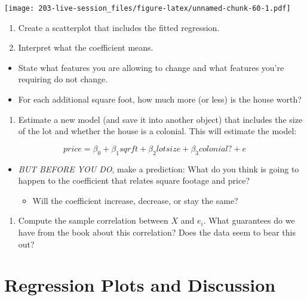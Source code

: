 \documentclass[
]{book}
\providecommand{\tightlist}{%
  \setlength{\itemsep}{0pt}\setlength{\parskip}{0pt}}
\theoremstyle{definition}
\theoremstyle{definition}
\theoremstyle{definition}
\theoremstyle{definition}
\theoremstyle{remark}
\begin{document}
\texttt{[image: 203-live-session\_files/figure-latex/unnamed-chunk-60-1.pdf]}

\begin{enumerate}
\def\labelenumi{\arabic{enumi}.}
\setcounter{enumi}{4}
\item
  Create a scatterplot that includes the fitted regression.
\item
  Interpret what the coefficient means.
\end{enumerate}

\begin{itemize}
\tightlist
\item
  State what features you are allowing to change and what features you're requiring do not change.
\item
  For each additional square foot, how much more (or less) is the house worth?
\end{itemize}

\begin{enumerate}
\def\labelenumi{\arabic{enumi}.}
\setcounter{enumi}{6}
\tightlist
\item
  Estimate a new model (and save it into another object) that includes the size of the lot and whether the house is a colonial. This will estimate the model:
\end{enumerate}

\[ 
price = \beta_{0} + \beta_{1} sqrft + \beta_{2} lotsize + \beta_{3} colonial? + e
\]

\begin{itemize}
\tightlist
\item
  \emph{BUT BEFORE YOU DO}, make a prediction: What do you think is going to happen to the coefficient that relates square footage and price?

  \begin{itemize}
  \tightlist
  \item
    Will the coefficient increase, decrease, or stay the same?
  \end{itemize}
\end{itemize}

\begin{enumerate}
\def\labelenumi{\arabic{enumi}.}
\setcounter{enumi}{6}
\tightlist
\item
  Compute the sample correlation between \(X\) and \(e_i\). What guarantees do we have from the book about this correlation? Does the data seem to bear this out?
\end{enumerate}

\hypertarget{regression-plots-and-discussion}{%
\section{Regression Plots and Discussion}\label{regression-plots-and-discussion}}
\end{document}
